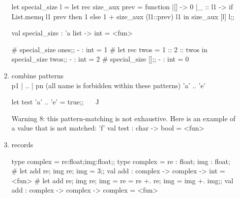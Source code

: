 \begin{enumerate}
\begin{enumerate}
\begin{redcode}
 let special_size l = 
    let rec size_aux prev = function 
      |[] -> 0 
      |_ :: l1  -> if List.memq l1 prev then 1 else 1 + size_aux (l1::prev) l1 in size_aux [l]  l;;
    \end{redcode}
\begin{bluecode}    
  val special_size : 'a list -> int = <fun>
\end{bluecode}

\begin{alternate}
# special_size ones;;
- : int = 1
# let rec twos = 1 :: 2 :: twos in special_size twos;;
- : int = 2
# special_size [];;
- : int = 0
\end{alternate}  
\item combine patterns \\
  p1 | .. |  pn (all name is forbidden within these patterns) 
 'a' .. 'e' 

 \begin{alternate}
let test 'a' .. 'e' = true;;
^^^^^^^^^^^^^^^^^
 \end{alternate}

\begin{bluecode}
Warning 8: this pattern-matching is not exhaustive.
Here is an example of a value that is not matched:
'f'
val test : char -> bool = <fun>
\end{bluecode}

    \item records

\begin{alternate}
type complex = {re:float;img:float};;
type complex = { re : float; img : float; }
# let add {re; img} {re; img} = 3;;
val add : complex -> complex -> int = <fun>
# let add {re; img} {re; img} = {re = re +. re; img = img +. img};;
val add : complex -> complex -> complex = <fun>
 \end{alternate}


\end{enumerate}
\end{enumerate}
